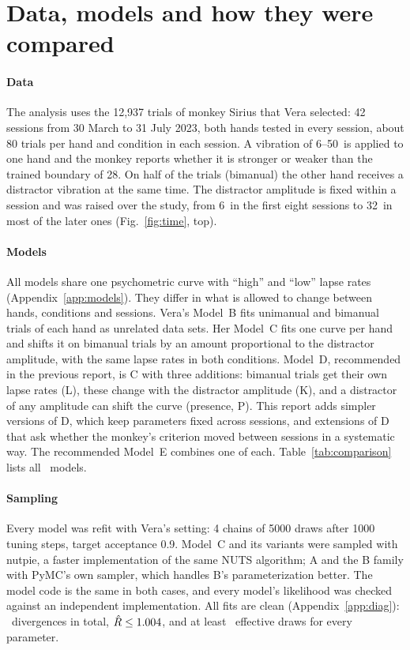 \section{Data, models and how they were compared}\label{sec:methods}

\paragraph{Data}
The analysis uses the 12,937 trials of monkey Sirius that Vera selected: 42 sessions from 30 March to 31 July 2023, both hands tested in every session, about 80 trials per hand and condition in each session.
A vibration of 6--50\um\ is applied to one hand and the monkey reports whether it is stronger or weaker than the trained boundary of 28\um.
On half of the trials (bimanual) the other hand receives a distractor vibration at the same time.
The distractor amplitude is fixed within a session and was raised over the study, from 6\um\ in the first eight sessions to 32\um\ in most of the later ones (Fig.~\ref{fig:time}, top).

\paragraph{Models}
All models share one psychometric curve with ``high'' and ``low'' lapse rates (Appendix~\ref{app:models}).
They differ in what is allowed to change between hands, conditions and sessions.
Vera's Model~B fits unimanual and bimanual trials of each hand as unrelated data sets.
Her Model~C fits one curve per hand and shifts it on bimanual trials by an amount proportional to the distractor amplitude, with the same lapse rates in both conditions.
Model~D, recommended in the previous report, is C with three additions: bimanual trials get their own lapse rates (L), these change with the distractor amplitude (K), and a distractor of any amplitude can shift the curve (presence, P).
This report adds simpler versions of D, which keep parameters fixed across sessions, and extensions of D that ask whether the monkey's criterion moved between sessions in a systematic way. The recommended Model~E combines one of each.
Table~\ref{tab:comparison} lists all \nModels\ models.

\paragraph{Sampling}
Every model was refit with Vera's setting: 4 chains of 5000 draws after 1000 tuning steps, target acceptance 0.9.
Model~C and its variants were sampled with nutpie, a faster implementation of the same NUTS algorithm; A and the B family with PyMC's own sampler, which handles B's parameterization better.
The model code is the same in both cases, and every model's likelihood was checked against an independent implementation.
All fits are clean (Appendix~\ref{app:diag}): \totalDiv\ divergences in total, $\hat R\le1.004$, and at least \minEssAll\ effective draws for every parameter.

